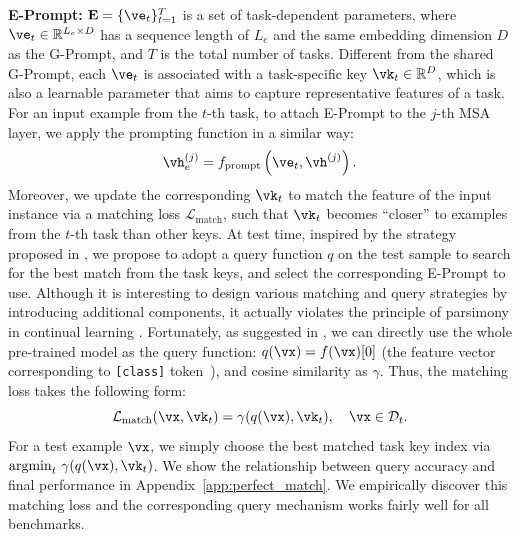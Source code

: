 \documentclass[runningheads]{llncs}
\newcommand{\gprompt}{G-Prompt\xspace}
\newcommand{\eprompt}{E-Prompt\xspace}
\def\pfunc{{f_{\text{prompt}}}}
\begin{document}
\textbf{\eprompt:} $\mathbf{E} = \{\ve_t\}_{t=1}^{T}$ is a set of task-dependent parameters, where $\ve_t \in \mathbb{R}^{L_e \times D}$ has a sequence length of $L_e$ and the same embedding dimension $D$ as the \gprompt, and $T$ is the total number of tasks. Different from the shared \gprompt, each $\ve_t$ is associated with a task-specific key $\vk_t \in \mathbb{R}^{D}$, which is also a learnable parameter that aims to capture representative features of a task. For an input example from the $t$-th task, to attach \eprompt to the $j$-th MSA layer, we apply the prompting function in a similar way:
\begin{equation} \label{eq:eprompt}
    \vh_e^{(j)} = \pfunc \left(\ve_t, \vh^{(j)}\right).
\end{equation}
Moreover, we update the corresponding $\vk_t$ to match the feature of the input instance via a matching loss $\mathcal{L}_{\text{match}}$, such that $\vk_t$ becomes ``closer'' to examples from the $t$-th task than other keys. At test time, inspired by the strategy proposed in \cite{wang2021learning}, we propose to adopt a query function $q$ on the test sample to search for the best match from the task keys, and select the corresponding \eprompt to use.
Although it is interesting to design various matching and query strategies by introducing additional components, it actually violates the principle of parsimony in continual learning \cite{hadsell2020embracing,wang2020learn}. Fortunately, as suggested in \cite{wang2021learning}, we can directly use the whole pre-trained model as the query function: $q(\vx) = f(\vx)[0]$ (the feature vector corresponding to \verb|[class]| token~\cite{dosovitskiy2020image}), and cosine similarity as $\gamma$. Thus, the matching loss takes the following form:
\begin{equation} \label{eq:match_loss}
    \mathcal{L}_{\text{match}}(\vx, \vk_t) = \gamma(q(\vx), \vk_t), \quad \vx \in \mathcal{D}_t.
\end{equation}
For a test example $\vx$, we simply choose the best matched task key index via ${\operatorname{argmin}}_{t}\  \gamma(q(\vx), \vk_t)$.
We show the relationship between query accuracy and final performance in Appendix~\ref{app:perfect_match}.
We empirically discover this matching loss and the corresponding query mechanism works fairly well for all benchmarks.
\end{document}
